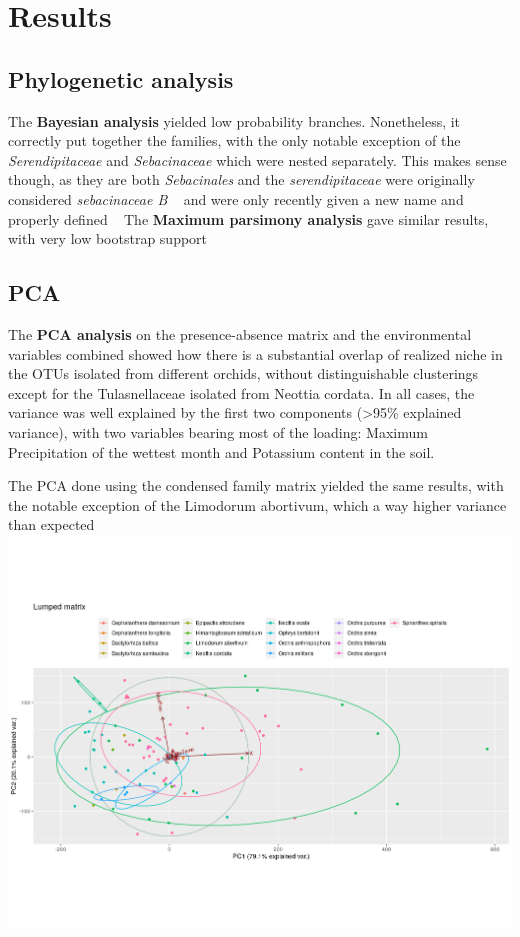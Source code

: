 \part{Results}
\label{results}

\chapter{Phylogenetic analysis}
\label{phylogeneticanalysis}

The \textbf{Bayesian analysis} yielded low probability branches. Nonetheless, it correctly put together the families, with the only notable exception of the \emph{Serendipitaceae} and \emph{Sebacinaceae} which were nested separately. This makes sense though, as they are both \emph{Sebacinales} and the \emph{serendipitaceae} were originally considered \emph{sebacinaceae B} ~\citep{weiss2004} and were only recently given a new name and properly defined ~\citep{weiss2016}
The \textbf{Maximum parsimony analysis} gave similar results, with very low bootstrap support

\chapter{PCA}
\label{pca}

The \textbf{PCA analysis} on the presence-absence matrix and the environmental variables combined showed how there is a substantial overlap of realized niche in the OTUs isolated from different orchids, without distinguishable clusterings except for the Tulasnellaceae isolated from Neottia cordata.
In all cases, the variance was well explained by the first two components (>95\% explained variance), with two variables bearing most of the loading: Maximum Precipitation of the wettest month and Potassium content in the soil.

The PCA done using the condensed family matrix yielded the same results, with the notable exception of the Limodorum abortivum, which a way higher variance than expected \includegraphics[keepaspectratio,width=\textwidth,height=0.75\textheight]{images/lumpPCA.png}

